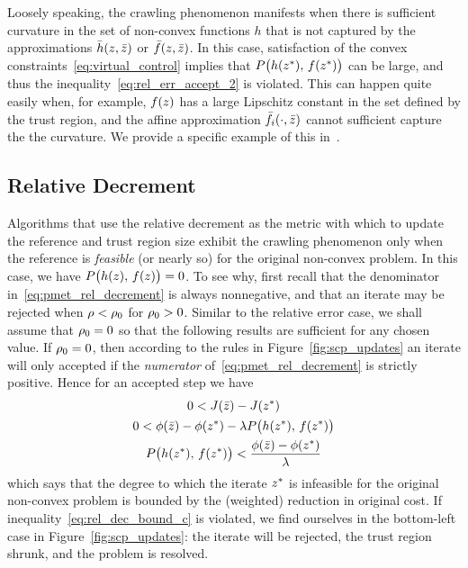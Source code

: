 \documentclass[letterpaper, 10 pt, conference]{ieeeconf}
\begin{document}
Loosely speaking, the crawling phenomenon manifests when there is sufficient curvature in the set of non-convex functions $h$ that is not captured by the approximations $\bar{h}(z,\bar{z})$ or $\bar{f}(z,\bar{z})$. In this case, satisfaction of the convex constraints~\eqref{eq:virtual_control} implies that $P\big(h(z^*),\,f(z^*)\big)$ can be large, and thus the inequality~\eqref{eq:rel_err_accept_2} is violated. This can happen quite easily when, for example, $f(z)$ has a large Lipschitz constant in the set defined by the trust region, and the affine approximation $\bar{f}_i(\cdot,\bar{z})$ cannot sufficient capture the the curvature. We provide a specific example of this in~.

\subsection{Relative Decrement}\label{subsec:crepp_rel_dec}

Algorithms that use the relative decrement as the metric with which to update the reference and trust region size exhibit the crawling phenomenon only when the reference is \textit{feasible} (or nearly so) for the original non-convex problem. In this case, we have $P\big(h(z),\,f(z)\big)=0$. To see why, first recall that the denominator in~\eqref{eq:pmet_rel_decrement} is always nonnegative, and that an iterate may be rejected when $\rho<\rho_0$ for $\rho_0>0$. Similar to the relative error case, we shall assume that $\rho_0=0$ so that the following results are sufficient for any chosen value. If $\rho_0=0$, then according to the rules in Figure~\ref{fig:scp_updates} an iterate will only accepted if the \textit{numerator} of~\eqref{eq:pmet_rel_decrement} is strictly positive. Hence for an accepted step we have
\begin{subequations}\label{eq:rel_dec_bound}
\begin{gather}
0 < J(\bar{z}) - J(z^*) \label{eq:rel_dec_bound_a}\\
0 < \phi(\bar{z}) - \phi(z^*) - \lambda P\big( h(z^*),\,f(z^*) \big) \label{eq:rel_dec_bound_b}\\
 P\big( h(z^*),\,f(z^*) \big) < \frac{\phi(\bar{z}) - \phi(z^*)}{\lambda} \label{eq:rel_dec_bound_c}
\end{gather}
\end{subequations}
which says that the degree to which the iterate $z^*$ is infeasible for the original non-convex problem is bounded by the (weighted) reduction in original cost. If inequality~\eqref{eq:rel_dec_bound_c} is violated, we find ourselves in the bottom-left case in Figure~\ref{fig:scp_updates}: the iterate will be rejected, the trust region shrunk, and the problem is resolved. 
\end{document}
